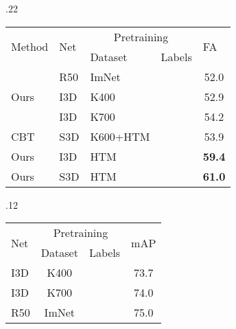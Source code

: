 \documentclass[10pt,twocolumn,letterpaper]{article}
\newcommand{\cmark}{\ding{51}}\newcommand{\xmark}{\ding{55}}\def\cvprPaperID{2151} \def\httilde{\mbox{\tt\raisebox{-.5ex}{\symbol{126}}}}
\newcommand{\rCOIN}{FA}
\newcommand{\ResNetFifty}{R50}
\newcommand{\KinSeven}{K700}
\newcommand{\KinFour}{K400}
\newcommand{\KinSix}{K600}
\newcommand{\HowToM}{HTM}
\newcommand{\ImageNet}{ImNet}
\newcommand{\tablestyle}[2]{\setlength{\tabcolsep}{#1}\renewcommand{\arraystretch}{#2}\centering\footnotesize}
\begin{document}
\begin{table*}
	\begin{subtable}[t]{.22\linewidth}\centering
		\tablestyle{2pt}{1.05}
		{      
\begin{tabular}[t]{lllc|c}
	\multirow{2}{*}{Method} & \multirow{2}{*}{Net} & \multicolumn{2}{c|}{Pretraining} & \multicolumn{1}{l}{\multirow{2}{*}{\rCOIN}} \\
	&                           & Dataset          & Labels      & \multicolumn{1}{l}{}                        \\ \hline
	\multirow{3}{*}{Ours}   & \ResNetFifty                      & ImNet            & \cmark       & 52.0                                        \\ & I3D                       & K400             & \cmark       & 52.9                                      \\
	& I3D                       & K700             & \cmark       & 54.2                                        \\
	CBT \cite{sun2019contrastive}                     & S3D                       & \KinSix+\HowToM      & \cmark       & 53.9                                        \\  \hline
	Ours                    & I3D                       & \HowToM           & \xmark       & \textbf{59.4}     \\  
	Ours                    & S3D                       & \HowToM           & \xmark       & \textbf{61.0}                                      
\end{tabular}}
		\caption{\textbf{COIN}}\label{tab:COIN}
	\end{subtable}
\hspace{\fill}
	\begin{subtable}[t]{.12\linewidth}
		\tablestyle{2pt}{1.05}
		{ 		     
\begin{tabular}[t]{lcc|c}
	\multirow{2}{*}{Net} & \multicolumn{2}{c|}{Pretraining}  & \multirow{2}{*}{mAP} \\
	& Dataset           & Labels                             &                      \\ \hline
	I3D                       & \KinFour      & \cmark           &  73.7                 \\
	I3D                       & \KinSeven      & \cmark           &  74.0                 \\
	\ResNetFifty                 & \ImageNet          & \cmark          &  75.0                 \\ \hline

\end{tabular}}
\end{subtable}
\end{table*}
\end{document}
